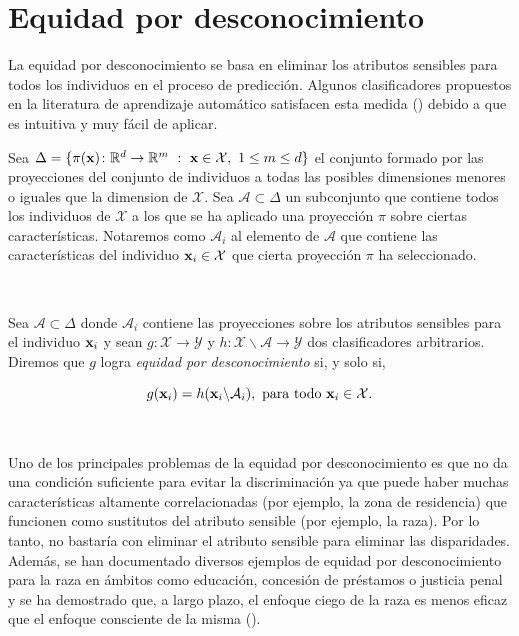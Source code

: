 \documentclass[oneside,openright,titlepage,numbers=noenddot,openany,headinclude,footinclude=true,
cleardoublepage=empty,abstractoff,BCOR=5mm,paper=a4,fontsize=12pt,main=spanish]{scrreprt}
\begin{document}
\section{Equidad por desconocimiento}

\label{sec:eqdesconocimiento}

La equidad por desconocimiento se basa en eliminar los atributos sensibles para todos los individuos en el proceso de predicción. Algunos clasificadores propuestos en la literatura de aprendizaje automático satisfacen esta medida (\cite{detect2012}) debido a que es intuitiva y muy fácil de aplicar.

\begin{notation}
Sea $\Delta=\{ \pi(\textbf{x})\colon \mathbb{R}^d \to \mathbb{R}^m  \ : \ \textbf{x} \in \mathcal{X}, \ 1 \leq m \leq d\}$ el conjunto formado por las proyecciones del conjunto de individuos a todas las posibles dimensiones menores o iguales que la dimension de $\mathcal{X}$. Sea $\mathcal{A} \subset \Delta$ un subconjunto que contiene todos los individuos de $\mathcal{X}$ a los que se ha aplicado una proyección $\pi$ sobre ciertas características. Notaremos como $\mathcal{A}_i$ al elemento de $\mathcal{A}$ que contiene las características del individuo $\textbf{x}_i\in \mathcal{X}$ que cierta proyección $\pi$ ha seleccionado.
\end{notation}\

\begin{definition}
Sea $\mathcal{A} \subset \Delta$ donde $\mathcal{A}_i$ contiene las proyecciones sobre los atributos sensibles para el individuo $\textbf{x}_i$ y sean $g\colon \mathcal{X} \to \mathcal{Y}$ y $h\colon \mathcal{X}\backslash \mathcal{A} \to \mathcal{Y}$ dos clasificadores arbitrarios. Diremos que $g$ logra \textit{equidad por desconocimiento} si, y solo si, 

\begin{equation*} 
g(\textbf{x}_i)=h(\textbf{x}_i \backslash \mathcal{A}_i), \ \text{para todo} \ \textbf{x}_i \in \mathcal{X}.
\end{equation*}
\end{definition}\

Uno de los principales problemas de la equidad por desconocimiento es que no da una condición suficiente para evitar la discriminación ya que puede haber muchas características altamente correlacionadas (por ejemplo, la zona de residencia) que funcionen como sustitutos del atributo sensible (por ejemplo, la raza). Por lo tanto, no bastaría con eliminar el atributo sensible para eliminar las disparidades. Además, se han documentado diversos ejemplos de equidad por desconocimiento para la raza en ámbitos como educación, concesión de préstamos o justicia
penal y se ha demostrado que, a largo plazo, el enfoque ciego de la raza es menos eficaz que el enfoque consciente de la misma (\cite{ceguera2008}).
\end{document}
